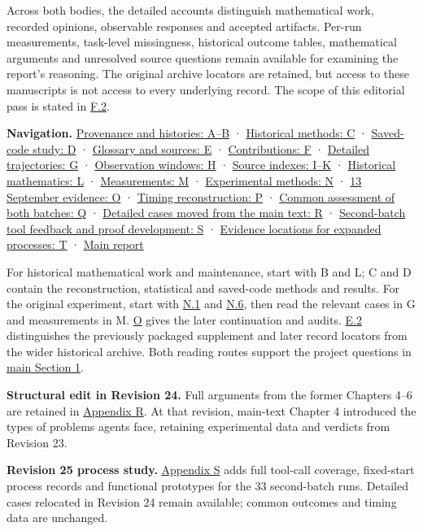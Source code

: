 Across both bodies, the detailed accounts distinguish mathematical work, recorded opinions, observable responses and accepted artifacts. Per-run measurements, task-level missingness, historical outcome tables, mathematical arguments and unresolved source questions remain available for examining the report's reasoning. The original archive locators are retained, but access to these manuscripts is not access to every underlying record. The scope of this editorial pass is stated in \hyperlink{f2}{F.2}.

\textbf{Navigation.} \hyperlink{appendix-a}{Provenance and histories: A–B} · \hyperlink{appendix-c}{Historical methods: C} · \hyperlink{appendix-d}{Saved-code study: D} · \hyperlink{appendix-e}{Glossary and sources: E} · \hyperlink{appendix-f}{Contributions: F} · \hyperlink{appendix-g}{Detailed trajectories: G} · \hyperlink{appendix-h}{Observation windows: H} · \hyperlink{appendix-i}{Source indexes: I–K} · \hyperlink{appendix-l}{Historical mathematics: L} · \hyperlink{appendix-m}{Measurements: M} · \hyperlink{appendix-n}{Experimental methods: N} · \hyperlink{appendix-o}{13 September evidence: O} · \hyperlink{appendix-p}{Timing reconstruction: P} · \hyperlink{appendix-q}{Common assessment of both batches: Q} · \hyperlink{appendix-r}{Detailed cases moved from the main text: R} · \hyperlink{appendix-s}{Second-batch tool feedback and proof development: S} · \hyperlink{appendix-t}{Evidence locations for expanded processes: T} · \href{en.pdf}{Main report}

For historical mathematical work and maintenance, start with B and L; C and D contain the reconstruction, statistical and saved-code methods and results. For the original experiment, start with \hyperlink{n1}{N.1} and \hyperlink{n6}{N.6}, then read the relevant cases in G and measurements in M. \hyperlink{appendix-o}{O} gives the later continuation and audits. \hyperlink{e2}{E.2} distinguishes the previously packaged supplement and later record locators from the wider historical archive. Both reading routes support the project questions in \href{en.pdf\#evaluation-questions}{main Section 1}.

\textbf{Structural edit in Revision 24.} Full arguments from the former Chapters 4–6 are retained in \hyperlink{appendix-r}{Appendix R}. At that revision, main-text Chapter 4 introduced the types of problems agents face, retaining experimental data and verdicts from Revision 23.

\textbf{Revision 25 process study.} \hyperlink{appendix-s}{Appendix S} adds full tool-call coverage, fixed-start process records and functional prototypes for the 33 second-batch runs. Detailed cases relocated in Revision 24 remain available; common outcomes and timing data are unchanged.

